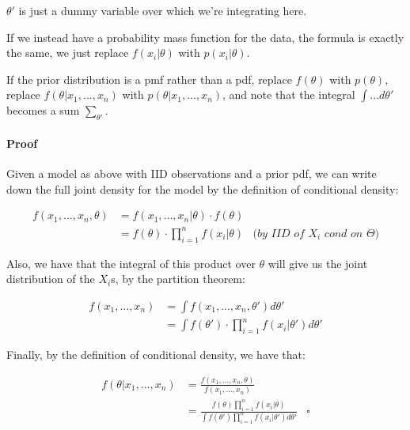 \documentclass[a4paper]{article}
\begin{document}
                $\theta'$ is just a dummy variable over which we're integrating
                here.

                If we instead have a probability mass function for the data, the
                formula is exactly the same, we just replace $f(x_i | \theta)$
                with $p(x_i | \theta)$.

                If the prior distribution is a pmf rather than a pdf, replace
                $f(\theta)$ with $p(\theta)$, replace $f(\theta | x_1, ...,
                x_n)$ with $p(\theta | x_1, ..., x_n)$, and note that the
                integral $\int ... d\theta'$ becomes a sum $\sum_{\theta'}$.

                \paragraph{Proof}
                    Given a model as above with IID observations and a prior
                    pdf, we can write down the full joint density for the model
                    by the definition of conditional density:

                    \begin{align*}
                        f(x_1, ..., x_n, \theta) & = f(x_1, ..., x_n | \theta)
                            \cdot f(\theta) \\
                        & = f(\theta) \cdot \prod_{i=1}^n f(x_i | \theta) &
                            \textit{(by IID of $X_i$ cond on $\Theta$)}
                    \end{align*}

                    Also, we have that the integral of this product over
                    $\theta$ will give us the joint distribution of the $X_i$s,
                    by the partition theorem:

                    \begin{align*}
                        f(x_1, ..., x_n) & = \int f(x_1, ..., x_n, \theta') d
                            \theta' \\
                        & = \int f(\theta') \cdot \prod_{i=1}^n f(x_i | \theta')
                            d\theta'
                    \end{align*}

                    Finally, by the definition of conditional density, we have
                    that:

                    \begin{align*}
                        f(\theta | x_1, ..., x_n) & = \frac{f(x_1, ..., x_n,
                            \theta)}{f(x_1, ..., x_n)} \\
                        & = \frac{f(\theta) \prod_{i=1}^n f(x_i | \theta)}{\int
                            f(\theta ') \prod_{i=1}^n f(x_i | \theta') d\theta'}
                            & \square
                    \end{align*}
\end{document}
